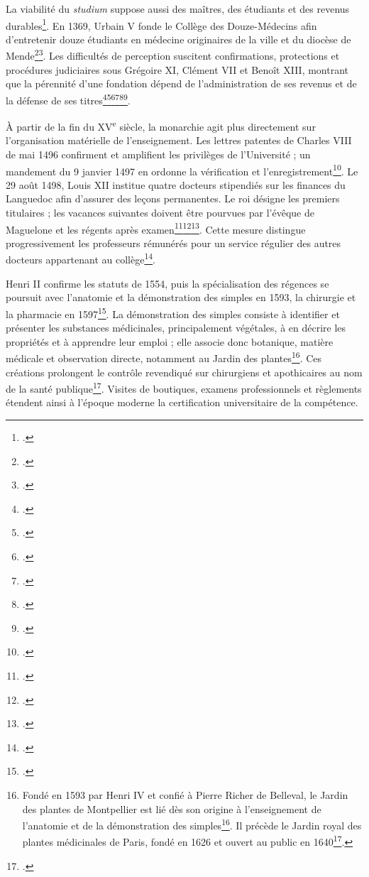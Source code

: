 La viabilité du \emph{studium} suppose aussi des maîtres, des étudiants et des revenus durables\footcite{Verger1991UniversitesMidi}. En 1369, Urbain V fonde le Collège des Douze-Médecins afin d'entretenir douze étudiants en médecine originaires de la ville et du diocèse de Mende\footcite{UrbainVCollege1369}\footcite{UrbainVCollege1369Germain}. Les difficultés de perception suscitent confirmations, protections et procédures judiciaires sous Grégoire XI, Clément VII et Benoît XIII, montrant que la pérennité d'une fondation dépend de l'administration de ses revenus et de la défense de ses titres\footcite{GregoireXICollege1371ADH}\footcite{GregoireXICollege1371Germain}\footcite{ClementVIICollege1392ADH}\footcite{ClementVIICollege1392Germain}\footcite{BenoitXIIICollege1395ADH}\footcite{BenoitXIIICollege1395Germain}.

À partir de la fin du XV\textsuperscript{e} siècle, la monarchie agit plus directement sur l'organisation matérielle de l'enseignement. Les lettres patentes de Charles VIII de mai 1496 confirment et amplifient les privilèges de l'Université ; un mandement du 9 janvier 1497 en ordonne la vérification et l'enregistrement\footcite{AHFMB25}. Le 29 août 1498, Louis XII institue quatre docteurs stipendiés sur les finances du Languedoc afin d'assurer des leçons permanentes. Le roi désigne les premiers titulaires ; les vacances suivantes doivent être pourvues par l'évêque de Maguelone et les régents après examen\footcite[fol.~75~v°--77~v°]{AHFMS1}\footcite{AHFMB26}\footcite[p~107--109]{Astruc1767}. Cette mesure distingue progressivement les professeurs rémunérés pour un service régulier des autres docteurs appartenant au collège\footcite{LavabreBertrand2021Esprit}.

Henri II confirme les statuts de 1554, puis la spécialisation des régences se poursuit avec l'anatomie et la démonstration des simples en 1593, la chirurgie et la pharmacie en 1597\footcite{LavabreBertrand2021Esprit}. La démonstration des simples consiste à identifier et présenter les substances médicinales, principalement végétales, à en décrire les propriétés et à apprendre leur emploi ; elle associe donc botanique, matière médicale et observation directe, notamment au Jardin des plantes\footnote{Fondé en 1593 par Henri IV et confié à Pierre Richer de Belleval, le Jardin des plantes de Montpellier est lié dès son origine à l'enseignement de l'anatomie et de la démonstration des simples\footcite{JardinPlantesMontpellier1984}. Il précède le Jardin royal des plantes médicinales de Paris, fondé en 1626 et ouvert au public en 1640\footcite{MNHNJardinPlantesParis}.}. Ces créations prolongent le contrôle revendiqué sur chirurgiens et apothicaires au nom de la santé publique\footcite[p. 321--322]{Irissou1934Pharmacie}. Visites de boutiques, examens professionnels et règlements étendent ainsi à l'époque moderne la certification universitaire de la compétence.

